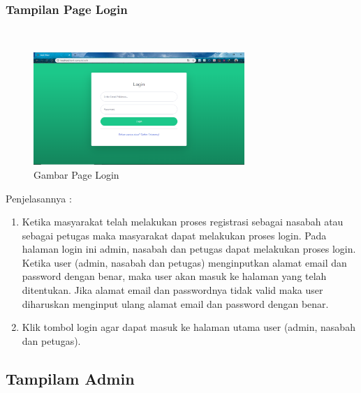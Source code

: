\subsubsection{Tampilan Page Login}
\hfill\\
	\begin{figure}[H]
		\includegraphics[width=8cm]{figures/analisis/19.png}
		\centering
		\caption{Gambar Page Login}
	\end{figure}
Penjelasannya :
\begin{enumerate}
\item Ketika masyarakat telah melakukan proses registrasi sebagai nasabah atau sebagai petugas maka masyarakat dapat melakukan proses login. Pada halaman login ini admin, nasabah dan petugas dapat melakukan proses login. Ketika user (admin, nasabah dan petugas) menginputkan alamat email dan password dengan benar, maka user akan masuk ke halaman yang telah ditentukan. Jika alamat email dan passwordnya tidak valid maka user diharuskan menginput ulang alamat email dan password dengan benar. 
\item Klik tombol login agar dapat masuk ke halaman utama user (admin, nasabah dan petugas).
\end{enumerate}

\subsection{Tampilam Admin}

